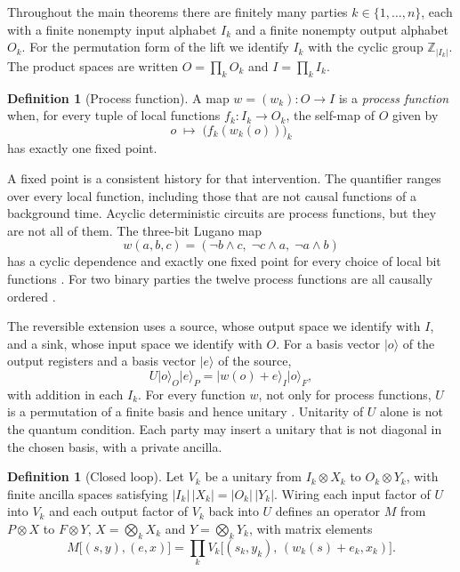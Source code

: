 \documentclass[11pt]{article}
\theoremstyle{definition}
\newtheorem{definition}[theorem]{Definition}
\theoremstyle{remark}
\newcommand{\ket}[1]{\lvert #1\rangle}
\begin{document}
Throughout the main theorems there are finitely many parties \(k\in\{1,\ldots,n\}\), each with a finite nonempty input alphabet \(I_k\) and a finite nonempty output alphabet \(O_k\). For the permutation form of the lift we identify \(I_k\) with the cyclic group \(\mathbb{Z}_{|I_k|}\). The product spaces are written \(O=\prod_k O_k\) and \(I=\prod_k I_k\).

\begin{definition}[Process function]
\label{def:pf}
A map \(w=(w_k):O\to I\) is a \emph{process function} when, for every tuple of local functions \(f_k:I_k\to O_k\), the self-map of \(O\) given by
\[
o\;\longmapsto\;\bigl(f_k(w_k(o))\bigr)_k
\]
has exactly one fixed point.
\end{definition}

A fixed point is a consistent history for that intervention. The quantifier ranges over every local function, including those that are not causal functions of a background time. Acyclic deterministic circuits are process functions, but they are not all of them. The three-bit Lugano map
\begin{equation}
\label{eq:lugano}
w(a,b,c)=(\lnot b\land c,\;\lnot c\land a,\;\lnot a\land b)
\end{equation}
has a cyclic dependence and exactly one fixed point for every choice of local bit functions \cite{baumeler2016,araujo2017}. For two binary parties the twelve process functions are all causally ordered \cite{oreshkov2012,baumann2016}.

The reversible extension uses a source, whose output space we identify with \(I\), and a sink, whose input space we identify with \(O\). For a basis vector \(\ket{o}\) of the output registers and a basis vector \(\ket{e}\) of the source,
\begin{equation}
\label{eq:U}
U\ket{o}_O\ket{e}_P=\ket{w(o)+e}_I\ket{o}_F,
\end{equation}
with addition in each \(I_k\). For every function \(w\), not only for process functions, \(U\) is a permutation of a finite basis and hence unitary \cite{baumeler2019}. Unitarity of \(U\) alone is not the quantum condition. Each party may insert a unitary that is not diagonal in the chosen basis, with a private ancilla.

\begin{definition}[Closed loop]
\label{def:loop}
Let \(V_k\) be a unitary from \(I_k\otimes X_k\) to \(O_k\otimes Y_k\), with finite ancilla spaces satisfying \(|I_k|\,|X_k|=|O_k|\,|Y_k|\). Wiring each input factor of \(U\) into \(V_k\) and each output factor of \(V_k\) back into \(U\) defines an operator \(M\) from \(P\otimes X\) to \(F\otimes Y\), \(X=\bigotimes_k X_k\) and \(Y=\bigotimes_k Y_k\), with matrix elements
\begin{equation}
\label{eq:M}
M\bigl[(s,y),(e,x)\bigr]
=\prod_k V_k\bigl[(s_k,y_k),\,(w_k(s)+e_k,x_k)\bigr].
\end{equation}
\end{definition}
\end{document}
